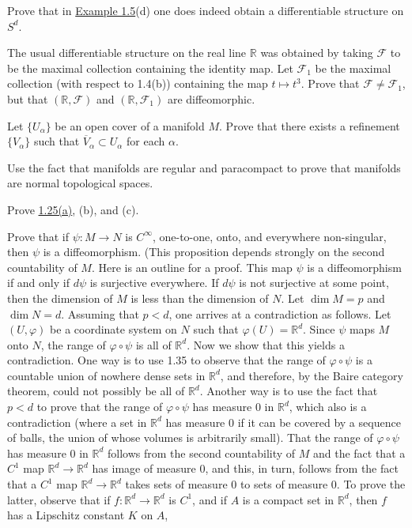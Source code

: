\begin{problemset}
	\item Prove that in \hyperref[thm:1.5]{Example 1.5}(d) one does indeed obtain a differentiable structure on  $ S^{d} $.

	\item The usual differentiable structure on the real line $\mathbb{R}$ was obtained by taking $\mathcal{F}$ to be the maximal collection containing the identity map. Let $\mathcal{F}_1$ be the maximal collection (with respect to 1.4(b)) containing the map $t \mapsto t^3$. Prove that $\mathcal{F} \neq \mathcal{F}_1$, but that $(\mathbb{R},\mathcal{F})$ and $(\mathbb{R},\mathcal{F}_1)$ are diffeomorphic.

	\item Let $\{U_{\alpha}\}$ be an open cover of a manifold $M$. Prove that there exists a refinement $\{V_{\alpha}\}$ such that $\overline{V}_{\alpha} \subset U_{\alpha}$ for each $\alpha$.

	\item Use the fact that manifolds are regular and paracompact to prove that manifolds are normal topological spaces.

	\item Prove \hyperref[thm:1.25]{1.25(a)}, (b), and (c).

	\item Prove that if $\psi: M \to N$ is $C^{\infty}$, one-to-one, onto, and everywhere non-singular, then $\psi$ is a diffeomorphism. (This proposition depends strongly on the second countability of $M$. Here is an outline for a proof. This map $\psi$ is a diffeomorphism if and only if $d\psi$ is surjective everywhere. If $d\psi$ is not surjective at some point, then the dimension of $M$ is less than the dimension of $N$. Let $\dim M = p$ and $\dim N = d$. Assuming that $p < d$, one arrives at a contradiction as follows. Let $(U,\varphi)$ be a coordinate system on $N$ such that $\varphi(U) = \mathbb{R}^d$. Since $\psi$ maps $M$ onto $N$, the range of $\varphi \circ \psi$ is all of $\mathbb{R}^d$. Now we show that this yields a contradiction. One way is to use 1.35 to observe that the range of $\varphi \circ \psi$ is a countable union of nowhere dense sets in $\mathbb{R}^d$, and therefore, by the Baire category theorem, could not possibly be all of $\mathbb{R}^d$. Another way is to use the fact that $p < d$ to prove that the range of $\varphi \circ \psi$ has measure 0 in $\mathbb{R}^d$, which also is a contradiction (where a set in $\mathbb{R}^d$ has measure 0 if it can be covered by a sequence of balls, the union of whose volumes is arbitrarily small). That the range of $\varphi \circ \psi$ has measure 0 in $\mathbb{R}^d$ follows from the second countability of $M$ and the fact that a $C^1$ map $\mathbb{R}^d \to \mathbb{R}^d$ has image of measure 0, and this, in turn, follows from the fact that a $C^1$ map $\mathbb{R}^d \to \mathbb{R}^d$ takes sets of measure 0 to sets of measure 0. To prove the latter, observe that if $f: \mathbb{R}^d \to \mathbb{R}^d$ is $C^1$, and if $A$ is a compact set in $\mathbb{R}^d$, then $f$ has a Lipschitz constant $K$ on $A$,


\end{problemset}
